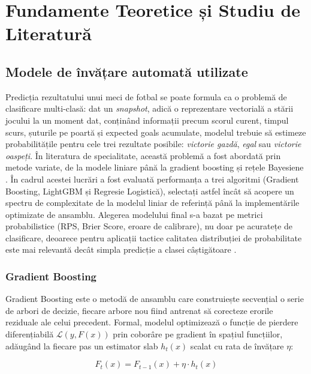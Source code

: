 \chapter{Fundamente Teoretice și Studiu de Literatură}
\label{chap:literatura}

\section{Modele de învățare automată utilizate}

Predicția rezultatului unui meci de fotbal se poate formula ca o problemă
de clasificare multi-clasă: dat un \textit{snapshot}, adică o reprezentare
vectorială a stării jocului la un moment dat, conținând informații precum
scorul curent, timpul scurs, șuturile pe poartă și expected goals acumulate,
modelul trebuie să estimeze probabilitățile pentru cele trei rezultate
posibile: \textit{victorie gazdă}, \textit{egal} sau
\textit{victorie oaspeți}. În literatura de specialitate, această problemă
a fost abordată prin metode variate, de la modele liniare până la
gradient boosting și rețele Bayesiene \cite{Robberechts2019, Maddox2022}.
În cadrul acestei lucrări a fost evaluată performanța a trei algoritmi
(Gradient Boosting, LightGBM și Regresie Logistică), selectați astfel
încât să acopere un spectru de complexitate de la modelul liniar de
referință până la implementările optimizate de ansamblu. Alegerea modelului
final s-a bazat pe metrici probabilistice (RPS, Brier Score, eroare de
calibrare), nu doar pe acuratețe de clasificare, deoarece pentru aplicații
tactice calitatea distribuției de probabilitate este mai relevantă decât
simpla predicție a clasei câștigătoare \cite{Robberechts2019}.

\subsection{Gradient Boosting}

Gradient Boosting este o metodă de ansamblu care construiește secvențial o
serie de arbori de decizie, fiecare arbore nou fiind antrenat să corecteze
erorile reziduale ale celui precedent. Formal, modelul optimizează o funcție
de pierdere diferențiabilă $\mathcal{L}(y, F(x))$ prin coborâre pe gradient
în spațiul funcțiilor, adăugând la fiecare pas un estimator slab $h_t(x)$
scalat cu rata de învățare $\eta$:

\begin{equation}
    F_t(x) = F_{t-1}(x) + \eta \cdot h_t(x)
\end{equation}

